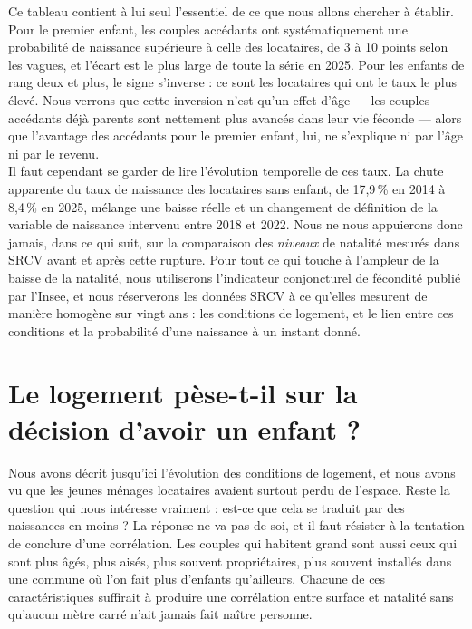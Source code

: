 \documentclass[12pt,a4paper]{article}
\begin{document}
\bigskip

\noindent Ce tableau contient à lui seul l'essentiel de ce que nous allons chercher à établir. Pour le premier enfant, les couples accédants ont systématiquement une probabilité de naissance supérieure à celle des locataires, de 3 à 10 points selon les vagues, et l'écart est le plus large de toute la série en 2025. Pour les enfants de rang deux et plus, le signe s'inverse : ce sont les locataires qui ont le taux le plus élevé. Nous verrons que cette inversion n'est qu'un effet d'âge — les couples accédants déjà parents sont nettement plus avancés dans leur vie féconde — alors que l'avantage des accédants pour le premier enfant, lui, ne s'explique ni par l'âge ni par le revenu. \\

\noindent Il faut cependant se garder de lire l'évolution temporelle de ces taux. La chute apparente du taux de naissance des locataires sans enfant, de 17,9\,\% en 2014 à 8,4\,\% en 2025, mélange une baisse réelle et un changement de définition de la variable de naissance intervenu entre 2018 et 2022. Nous ne nous appuierons donc jamais, dans ce qui suit, sur la comparaison des \textit{niveaux} de natalité mesurés dans SRCV avant et après cette rupture. Pour tout ce qui touche à l'ampleur de la baisse de la natalité, nous utiliserons l'indicateur conjoncturel de fécondité publié par l'Insee, et nous réserverons les données SRCV à ce qu'elles mesurent de manière homogène sur vingt ans : les conditions de logement, et le lien entre ces conditions et la probabilité d'une naissance à un instant donné.

\newpage
	
\section{Le logement pèse-t-il sur la décision d'avoir un enfant ?}

Nous avons décrit jusqu'ici l'évolution des conditions de logement, et nous avons vu que les jeunes ménages locataires avaient surtout perdu de l'espace. Reste la question qui nous intéresse vraiment : est-ce que cela se traduit par des naissances en moins ? La réponse ne va pas de soi, et il faut résister à la tentation de conclure d'une corrélation. Les couples qui habitent grand sont aussi ceux qui sont plus âgés, plus aisés, plus souvent propriétaires, plus souvent installés dans une commune où l'on fait plus d'enfants qu'ailleurs. Chacune de ces caractéristiques suffirait à produire une corrélation entre surface et natalité sans qu'aucun mètre carré n'ait jamais fait naître personne. \\
\end{document}
